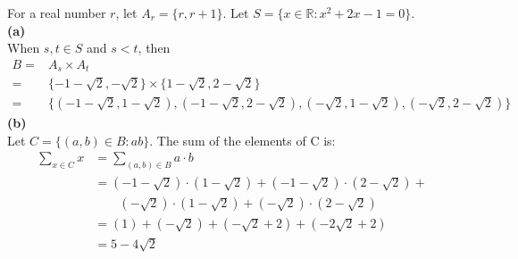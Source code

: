 \documentclass[11pt]{article}
\begin{document}
For a real number $r$, let $A_r = \{r, r+1\}$. Let $S = \{x \in \mathbb{R} : x^2 + 2x - 1 = 0\}$. \\
\textbf{(a)}\\
When $s, t \in S$ and $s < t$, then 
\begin{align*}
    B =& A_s \times A_t \\
    =& \{-1 - \sqrt{2}, -\sqrt{2}\} \times \{1 - \sqrt{2}, 2 -\sqrt{2}\} \\
    =& \{  (-1-\sqrt{2}, 1-\sqrt{2}), (-1-\sqrt{2},2 -\sqrt{2}), (-\sqrt{2}, 1 - \sqrt{2}), (-\sqrt{2}, 2 -\sqrt{2})  \}
\end{align*}
\textbf{(b)}\\
Let $C = \{(a, b) \in B : ab\}$. The sum of the elements of C is:
\begin{align*}
    \sum_{x \in C} x &= \sum_{(a,b) \in B} a \cdot b \\
    &= (-1-\sqrt{2}) \cdot (1-\sqrt{2}) + (-1-\sqrt{2}) \cdot (2-\sqrt{2}) +\\ 
    &\qquad  (-\sqrt{2}) \cdot (1-\sqrt{2}) + (-\sqrt{2}) \cdot (2-\sqrt{2})\\
    &= (1) + (-\sqrt{2}) + (-\sqrt{2}+2) + (-2\sqrt{2}+2)\\
    &= 5-4\sqrt{2}
\end{align*}


\newpage
\end{document}
